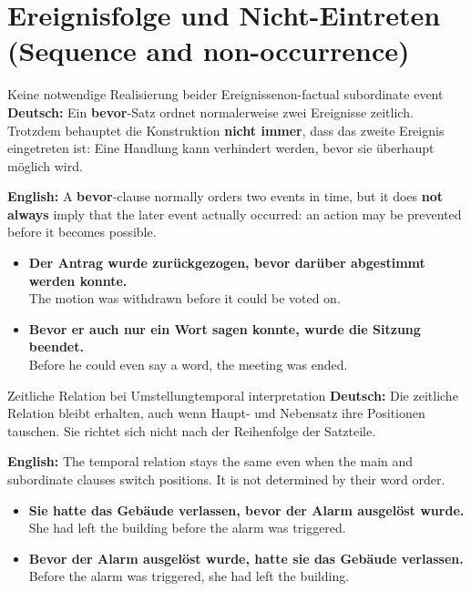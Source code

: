 \documentclass[a4paper,11pt]{article}
\newcommand{\GermanText}[1]{\textbf{Deutsch: }#1\par}
\newcommand{\EnglishText}[1]{{\small\color{SoftGray}\textbf{English: }#1\par}}
\newcommand{\ExampleItem}[2]{\item \textbf{#1}\\{\small\color{SoftGray}#2}}
\begin{document}
    \section{Ereignisfolge und Nicht-Eintreten (Sequence and non-occurrence)}
        \begin{grammarentry}{Keine notwendige Realisierung beider Ereignisse}{non-factual subordinate event}
            \GermanText{Ein \textbf{bevor}-Satz ordnet normalerweise zwei Ereignisse zeitlich. Trotzdem behauptet die Konstruktion \textbf{nicht immer}, dass das zweite Ereignis eingetreten ist: Eine Handlung kann verhindert werden, bevor sie überhaupt möglich wird.}
            \EnglishText{A \textbf{bevor}-clause normally orders two events in time, but it does \textbf{not always} imply that the later event actually occurred: an action may be prevented before it becomes possible.}
        \end{grammarentry}
        \begin{exbox}
            \begin{itemize}
                \ExampleItem{Der Antrag wurde zurückgezogen, bevor darüber abgestimmt werden konnte.}{The motion was withdrawn before it could be voted on.}
                \ExampleItem{Bevor er auch nur ein Wort sagen konnte, wurde die Sitzung beendet.}{Before he could even say a word, the meeting was ended.}
            \end{itemize}
        \end{exbox}
        \begin{grammarentry}{Zeitliche Relation bei Umstellung}{temporal interpretation}
            \GermanText{Die zeitliche Relation bleibt erhalten, auch wenn Haupt- und Nebensatz ihre Positionen tauschen. Sie richtet sich nicht nach der Reihenfolge der Satzteile.}
            \EnglishText{The temporal relation stays the same even when the main and subordinate clauses switch positions. It is not determined by their word order.}
        \end{grammarentry}
        \begin{exbox}
            \begin{itemize}
                \ExampleItem{Sie hatte das Gebäude verlassen, bevor der Alarm ausgelöst wurde.}{She had left the building before the alarm was triggered.}
                \ExampleItem{Bevor der Alarm ausgelöst wurde, hatte sie das Gebäude verlassen.}{Before the alarm was triggered, she had left the building.}
            \end{itemize}
        \end{exbox}
\end{document}
